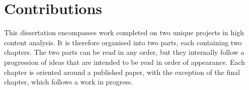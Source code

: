 %
%
%
%

\section{Contributions}

This dissertation encompasses work completed on two unique projects in high content analysis. It is therefore organised into two parts, each containing two chapters. The two parts can be read in any order, but they internally follow a progression of ideas that are intended to be read in order of appearance. Each chapter is oriented around a published paper, with the exception of the final chapter, which follows a work in progress. 


